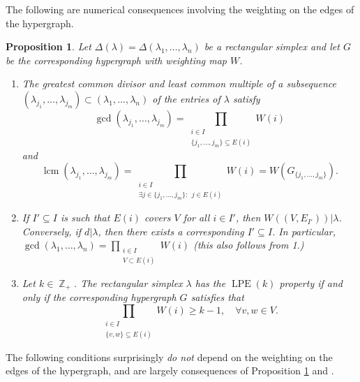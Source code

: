 \documentclass[a4paper,11pt]{amsart}
\theoremstyle{plain}
\newtheorem{proposition}[theorem]{Proposition}
\theoremstyle{definition}
\theoremstyle{remark}
\DeclareMathOperator{\ZZ}{\mathbb{Z}}
\DeclareMathOperator{\lcm}{lcm}
\DeclareMathOperator{\LPE}{LPE}
\begin{document}
The following are numerical consequences involving the weighting on the edges of the hypergraph.

\begin{proposition}\label{proposition:conditions-depending-on-weighting}
    Let $\Delta(\lambda) = \Delta(\lambda_1, \ldots, \lambda_n)$ be a rectangular simplex and let $G$ be the corresponding hypergraph with weighting map $W$.
    \begin{enumerate}[1.]
        \item The greatest common divisor and least common multiple of a subsequence $(\lambda_{j_1}, \ldots, \lambda_{j_m}) \subset (\lambda_1, \ldots, \lambda_n)$ of the entries of $\lambda$ satisfy
        \[
        \gcd(\lambda_{j_1}, \ldots, \lambda_{j_m}) = \prod_{\substack{i \in I\\\{j_1, \ldots, j_m\} \subseteq E(i)}} W(i)
        \]
        and
        \[
        \lcm(\lambda_{j_1}, \ldots, \lambda_{j_m}) = \prod_{\substack{i \in I\\\exists j \in \{j_1, \ldots, j_m\}:~~j \in E(i)}} W(i) = W(G_{\{j_1, \ldots, j_m\}}).
        \]
        \item If $I' \subseteq I$ is such that $E(i)$ covers $V$ for all $i \in I'$, then $W((V, E_{I'})) | \lambda$. Conversely, if $d | \lambda$, then there exists a corresponding $I' \subseteq I$. In particular, $\gcd(\lambda_1, \ldots, \lambda_n) = \prod_{\substack{i \in I\\V \subset E(i)}} W(i)$ (this also follows from 1.)
        \item Let $k \in \ZZ_+$. The rectangular simplex $\lambda$ has the $\LPE(k)$ property if and only if the corresponding hypergraph $G$ satisfies that
        \[
        \prod_{\substack{i \in I\\\{v, w\} \subseteq E(i)}} W(i) \geq k - 1, \quad \forall v, w \in V.
        \]
    \end{enumerate}
\end{proposition}

The following conditions surprisingly \emph{do not} depend on the weighting on the edges of the hypergraph, and are largely consequences of Proposition \ref{proposition:conditions-depending-on-weighting} and \cite{BrunsGubeladze:1999}.
\end{document}
